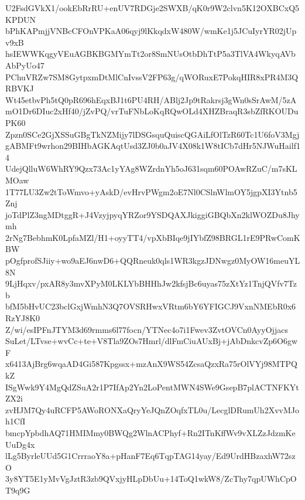 U2FsdGVkX1/ookEbRrRU+enUV7RDGje2SWXB/qK0r9W2clvn5K12OXBCxQ5KPDUN
bPhKAPmjjVNBcCFOnVPKaA06qyj9lKkqdxW480W/wmKe1j5JCuIyrYR02jUpv9xB
hsIEWWKqgyVEuAGBKBGMYmTt2or8SmNUsOtbDhTtP5a3TlVA4WkyqAVbAbPyUo47
PChuVRZw7SM8GytpxmDtMlCnIvssV2FP63g/qWORuxE7PokqHIR8xPR4M3QRBVKJ
Wt45etbvPh5tQ0pR696hEqxBJ1t6PU4RH/ABlj2Jp9tRakrsj3gWn0sSrAwM/5zA
mO1Dr6DIuc2xHf40/jZvPQ/vrTuFNbLoKqRQwOLd4XHZBraqR3sbZfRKOUDuPK60
Zpzn0SCe2GjXSSuGBgTkNZMijy7lDSGsquQuiscQGAiLfOlTzR60Tc1U6foV3Mgj
gABMFt9wrhon29BIHbAGKAqtUsd3ZJ0b0aJV4X08k1W8tICb7dHr5NJWuHailf14
UdejQlluW6WhRY9Qzx73Ac1yYAg8WZrdnYh5oJ631sqm60POAwRZuC/m7sKLMOaw
1T77LU3Zw2tToWmvo+yAskD/evHrvPWgm2oE7Nl0CSlnWlmOY5jgpXI3Ytnb5Znj
joTdPlZ3ngMDtggR+J4VzyjpyqYRZor9YSDQAXJkiggiGBQbXn2klWOZDu8Jhymh
2rNg7BebhmK0LpfaMZl/H1+oyyTT4/vpXbBIqe9jIYbfZ98BRGL1rE9PRwComKBW
pOgfprofSJiiy+wo9aEJ6nwD6+QQRneuk0qls1WR3kgzJDNwgz0MyOW16meuYL8N
9LjHqxv/pxAR8y3mvXPyM0LKLYbBHHhJw2kfsjBc6uyas75zXtYz1TnjQVfv7Tzb
bfM5bHvUC23bclGxjWmhN3Q7OVSRHwxVRtm6bY6YFIGCJ9VxnNMEbR0x6RzYJ8K0
Z/wi/esIPFnJTYM3d69rmms6l77focn/YTNec4o7i1Fwev3ZvtOVCn0AyyOjjacs
SuLet/LTvse+wvCc+te+V8Tla9ZOs7Hmrl/dlFmCiuAUxBj+jAbDnkcvZp6O6gwF
x6413AjBrg6wqaAD4Gi587Kpgssx+mzAnX9WS54ZcsaQzxRa75rOlVYj98MTPQkZ
ISgWwk9Y4MgQdZSuA2r1P7IfAp2Yn2LoPentMWN4SWe9GsepB7plACTNFKYtZX2i
zvHJM7Qy4uRCFP5AWoRONXaQryYeJQnZOqfxTL0u/LecglDRumUh2XvvMJoh1CfI
bmcpYpbdhAQ71HMIMmy0BWQg2WlnACPhyf+Rn2ITnKffWv9vXLZzJdzmKeUuDg4x
lLg5ByrleUUd5G1CrrraoY8a+pHanF7Eq6TqpTAG14yay/Ed9UrdHBzaxhW72szO
3y8YT5E1yMvVgJztR3zb9QVxjyHLpDbUu+14ToQ1wkW8/ZcThy7qpUWhCpOT9q9G

